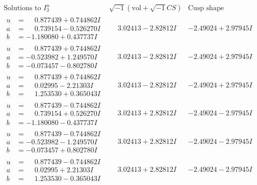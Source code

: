 \documentclass[1p]{elsarticle_modified}
\theoremstyle{definition}
\newcommand{\I}{\sqrt{-1}}
\begin{document}
$$\begin{array}{c|c|c}  
\text{Solutions to }I^u_{3}& \I (\text{vol} + \sqrt{-1}CS) & \text{Cusp shape}\\
 \hline 
\begin{aligned}
u &= \phantom{-}0.877439 + 0.744862 I \\
a &= \phantom{-}0.739154 - 0.526270 I \\
b &= -1.180080 + 0.437737 I\end{aligned}
 & \phantom{-}3.02413 - 2.82812 I & -2.49024 + 2.97945 I \\ \hline\begin{aligned}
u &= \phantom{-}0.877439 + 0.744862 I \\
a &= -0.523982 + 1.249570 I \\
b &= -0.073457 - 0.802780 I\end{aligned}
 & \phantom{-}3.02413 - 2.82812 I & -2.49024 + 2.97945 I \\ \hline\begin{aligned}
u &= \phantom{-}0.877439 + 0.744862 I \\
a &= \phantom{-}0.02995 - 2.21303 I \\
b &= \phantom{-}1.253530 + 0.365043 I\end{aligned}
 & \phantom{-}3.02413 - 2.82812 I & -2.49024 + 2.97945 I \\ \hline\begin{aligned}
u &= \phantom{-}0.877439 - 0.744862 I \\
a &= \phantom{-}0.739154 + 0.526270 I \\
b &= -1.180080 - 0.437737 I\end{aligned}
 & \phantom{-}3.02413 + 2.82812 I & -2.49024 - 2.97945 I \\ \hline\begin{aligned}
u &= \phantom{-}0.877439 - 0.744862 I \\
a &= -0.523982 - 1.249570 I \\
b &= -0.073457 + 0.802780 I\end{aligned}
 & \phantom{-}3.02413 + 2.82812 I & -2.49024 - 2.97945 I \\ \hline\begin{aligned}
u &= \phantom{-}0.877439 - 0.744862 I \\
a &= \phantom{-}0.02995 + 2.21303 I \\
b &= \phantom{-}1.253530 - 0.365043 I\end{aligned}
 & \phantom{-}3.02413 + 2.82812 I & -2.49024 - 2.97945 I \\ \hline\begin{aligned}

\end{aligned}
\end{array}$$
\end{document}
